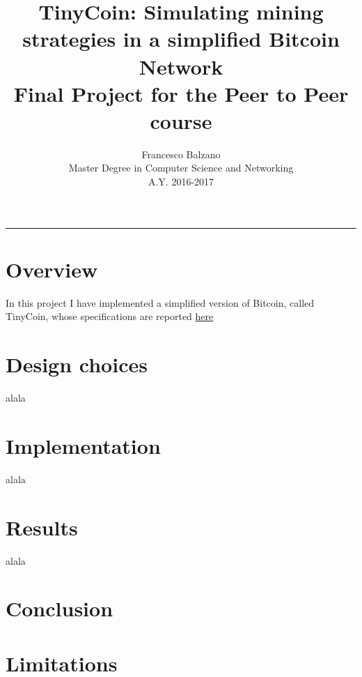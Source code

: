 \documentclass{article}
\title{ \textbf {\vspace{0.5cm}\Huge TinyCoin: Simulating mining strategies in a simplified Bitcoin Network\\ \vspace{0.5cm}}
 Final Project for the Peer to Peer course \vspace{1.0cm}\\}
\date{\vspace{1.7cm}}
\author{ \Large Francesco Balzano \vspace{0.3cm}\\ 
\Large Master Degree in Computer Science and Networking \vspace{0.4cm} \\
\Large A.Y. 2016-2017 
}
\begin{document}
  \maketitle
  \noindent\rule{18cm}{0.4pt}
  \tableofcontents
  \newpage

\clearpage
\setcounter{page}{2}
  
\section{Overview}  
In this project I have implemented a simplified version of Bitcoin, called TinyCoin, whose specifications are reported \href{https://elearning.di.unipi.it/pluginfile.php/14179/mod_assign/intro/SelfishMining.pdf}{here}

\section{Design choices}


alala

\section{Implementation}  

alala

\section{Results}


alala


\section{Conclusion}




\section{Limitations} 
\end{document}
